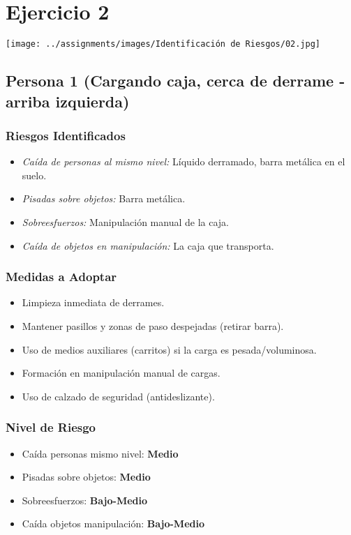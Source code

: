 \documentclass[12pt,a4paper]{article}
\begin{document}
	\hrulefill
	
	\section{Ejercicio 2}
	
	\texttt{[image: ../assignments/images/Identificación de Riesgos/02.jpg]}
	
	\subsection{Persona 1 (Cargando caja, cerca de derrame - arriba izquierda)}
	
	\subsubsection{Riesgos Identificados}
	\begin{itemize}
		\item \textit{Caída de personas al mismo nivel:} Líquido derramado, barra metálica en el suelo.
		\item \textit{Pisadas sobre objetos:} Barra metálica.
		\item \textit{Sobreesfuerzos:} Manipulación manual de la caja.
		\item \textit{Caída de objetos en manipulación:} La caja que transporta.
	\end{itemize}
	
	\subsubsection{Medidas a Adoptar}
	\begin{itemize}
		\item Limpieza inmediata de derrames.
		\item Mantener pasillos y zonas de paso despejadas (retirar barra).
		\item Uso de medios auxiliares (carritos) si la carga es pesada/voluminosa.
		\item Formación en manipulación manual de cargas.
		\item Uso de calzado de seguridad (antideslizante).
	\end{itemize}
	
	\subsubsection{Nivel de Riesgo}
	\begin{itemize}
		\item Caída personas mismo nivel: \textbf{Medio}
		\item Pisadas sobre objetos: \textbf{Medio}
		\item Sobreesfuerzos: \textbf{Bajo-Medio}
		\item Caída objetos manipulación: \textbf{Bajo-Medio}
	\end{itemize}
	
\end{document}
